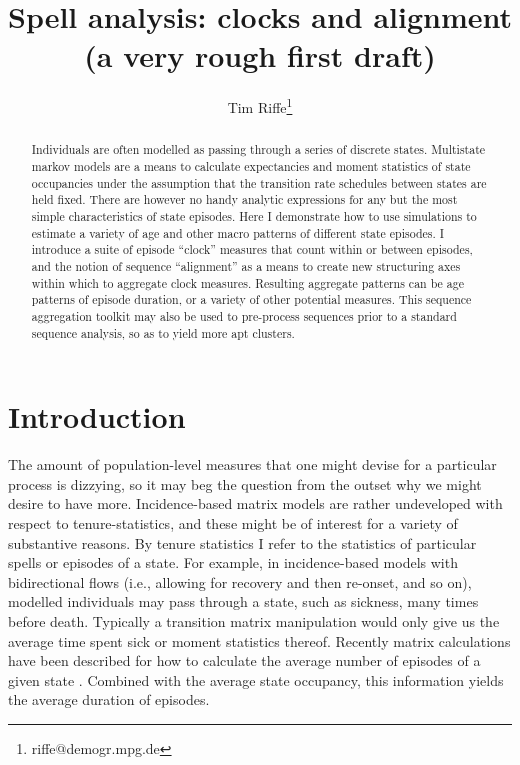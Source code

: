 \documentclass{article}
\begin{document}
\title{Spell analysis: clocks and alignment \\ (a very rough first draft)}
\author[1]{Tim Riffe\thanks{riffe@demogr.mpg.de}}
\maketitle

\begin{abstract}
Individuals are often modelled as passing through a series of discrete
states. Multistate markov models are a means to calculate expectancies and
moment statistics of state occupancies under the assumption that the transition
rate schedules between states are held fixed. There are however no handy
analytic expressions for any but the most simple characteristics of state episodes. Here
I demonstrate how to use simulations to estimate a variety of age and other
macro patterns of different state episodes. I introduce a
suite of episode ``clock'' measures that count within or between episodes, and the notion of
sequence ``alignment'' as a means to create new structuring axes within which to
aggregate clock measures. Resulting aggregate patterns can be age patterns of
episode duration, or a variety of other potential measures. This sequence
aggregation toolkit may also be used to pre-process sequences prior to a
standard sequence analysis, so as to yield more apt clusters. 
\end{abstract}

\section{Introduction}
The amount of population-level measures that one might devise for a particular
process is dizzying, so it may beg the question from the outset
why we might desire to have more. Incidence-based matrix
models are rather undeveloped with respect to tenure-statistics, and these
might be of interest for a variety of substantive reasons. By tenure statistics I
refer to the statistics of particular spells or episodes of a state. For
example, in incidence-based models with bidirectional flows (i.e., allowing for
recovery and then re-onset, and so on), modelled individuals may pass through a state,
such as sickness, many times before death. Typically a transition matrix
manipulation would only give us the average time spent sick or moment statistics
thereof. Recently matrix calculations have been described for how to calculate the average number of episodes of a given state \citep{dudel2017b}.
Combined with the average state occupancy, this information yields the average
duration of episodes.
\end{document}
